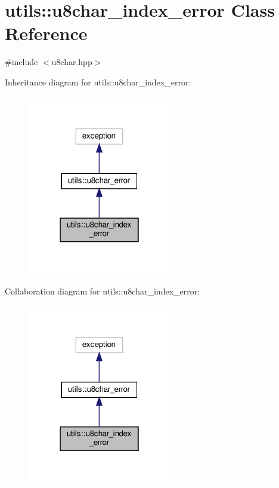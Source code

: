 \hypertarget{classutils_1_1u8char__index__error}{}\section{utils\+:\+:u8char\+\_\+index\+\_\+error Class Reference}
\label{classutils_1_1u8char__index__error}


{\ttfamily \#include $<$u8char.\+hpp$>$}



Inheritance diagram for utils\+:\+:u8char\+\_\+index\+\_\+error\+:\nopagebreak
\begin{figure}[H]
\begin{center}
\leavevmode
\includegraphics[width=178pt]{classutils_1_1u8char__index__error__inherit__graph}
\end{center}
\end{figure}


Collaboration diagram for utils\+:\+:u8char\+\_\+index\+\_\+error\+:\nopagebreak
\begin{figure}[H]
\begin{center}
\leavevmode
\includegraphics[width=178pt]{classutils_1_1u8char__index__error__coll__graph}
\end{center}
\end{figure}


